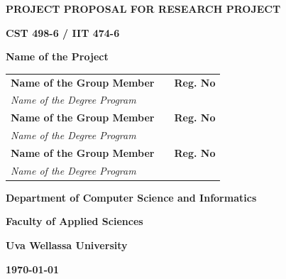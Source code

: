 \begin{titlepage}
    \centering

    \textbf{\Large PROJECT PROPOSAL FOR RESEARCH PROJECT}

    \vspace{0.5cm}
    
    \textbf{\Large CST 498-6 / IIT 474-6}

    \vspace{0.5cm}
    
    \textbf{\Large Name of the Project}

    \vfill

    \begin{tabularx}{0.6\textwidth}{@{}lX@{}r@{}}
        \textbf{\normalsize Name of the Group Member} &   & \textbf{Reg. No} \\
        \multicolumn{3}{l}{\textit{Name of the Degree Program}} \\
        \textbf{\normalsize Name of the Group Member} &   & \textbf{Reg. No} \\
        \multicolumn{3}{l}{\textit{Name of the Degree Program}} \\
        \textbf{\normalsize Name of the Group Member} &   & \textbf{Reg. No} \\
        \multicolumn{3}{l}{\textit{Name of the Degree Program}} \\
    \end{tabularx}
 
    \vfill

    \textbf{\large Department of Computer Science and Informatics}

    \textbf{\large Faculty of Applied Sciences}

    \textbf{\large Uva Wellassa University}

    \vspace{0.5cm}

    \textbf{\large \monthyeardate\today}

\end{titlepage}